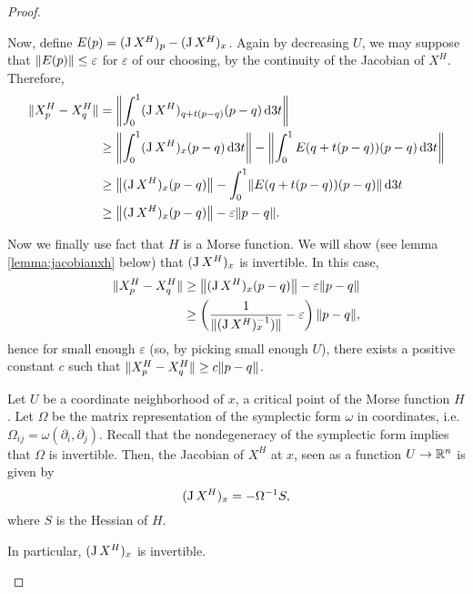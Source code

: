\begin{proof}
\begin{lemmaproof}
Now, define $E(p) = (\jacobian X^H)_p - (\jacobian X^H)_x$. Again by decreasing $U$, we may suppose that $\Norm{E(p)} \leq \varepsilon$ for $\varepsilon$ of our choosing, by the continuity of the Jacobian of $X^H$. Therefore,
\begin{equation}
\begin{aligned}
\Norm{X^H_p - X^H_q} &= \Norm*{\int_0^1 (\jacobian X^H)_{q+t(p-q)} (p-q) \dl3 t}\\
&\geq \Norm*{\int_0^1 (\jacobian X^H)_{x} (p-q) \dl3 t} - \Norm*{\int_0^1 E(q + t(p-q)) (p-q) \dl3 t}\\
&\geq \Norm*{(\jacobian X^H)_{x} (p-q)} - \int_0^1 \Norm{E(q + t(p-q)) (p-q)} \dl3 t\\
&\geq \Norm*{(\jacobian X^H)_{x} (p-q)} - \varepsilon \Norm{p-q}.
\end{aligned}
\end{equation}

Now we finally use fact that $H$ is a Morse function. We will show (see lemma \ref{lemma:jacobianxh} below) that $(\jacobian X^H)_x$ is invertible. In this case,
\begin{equation}
\begin{aligned}
\Norm{X^H_p - X^H_q} &\geq \Norm*{(\jacobian X^H)_{x} (p-q)} - \varepsilon \Norm{p-q}\\
&\geq \left( \frac1{\Norm{(\jacobian X^H)_x^{-1})}} - \varepsilon \right) \Norm{p-q},
\end{aligned}
\end{equation}
hence for small enough $\varepsilon$ (so, by picking small enough $U$), there exists a positive constant $c$ such that $\Norm{X^H_p - X^H_q} \geq c \Norm{p-q}$.
\end{lemmaproof}

\begin{lemma}\label{lemma:jacobianxh}
Let $U$ be a coordinate neighborhood of $x$, a critical point of the Morse function $H$. Let $\Omega$ be the matrix representation of the symplectic form $\omega$ in coordinates, i.e. $\Omega_{ij} = \omega(\partial_i, \partial_j)$. Recall that the nondegeneracy of the symplectic form implies that $\Omega$ is invertible. Then, the Jacobian of $X^H$ at $x$, seen as a function $U \to \R^n$ is given by
\begin{equation}
(\jacobian X^H)_x = - \Omega^{-1} S,
\end{equation}
where $S$ is the Hessian of $H$.

In particular, $(\jacobian X^H)_x$ is invertible.
\end{lemma}


\end{proof}
